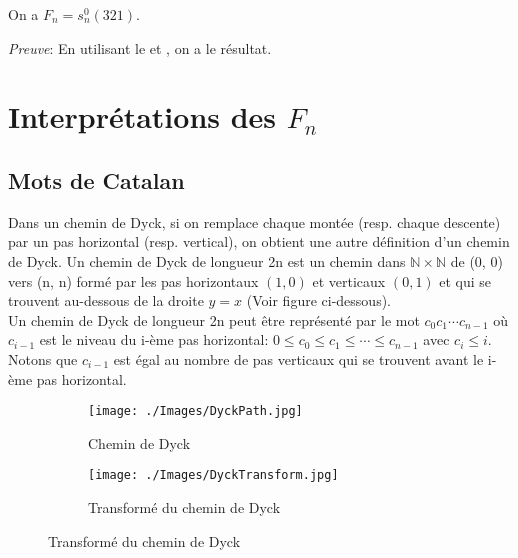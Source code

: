 \begin{corollaire} \label{fn_and_avoiding_321_without_fix}
	On a $F_{n} = s_{n}^{0}(321)$.
\end{corollaire}
\textit{Preuve}:
En utilisant le  et , on a le résultat.

\section{Interprétations des $F_{n}$}
\subsection{Mots de Catalan}
Dans un chemin de Dyck, si on remplace chaque montée (resp. chaque descente) par un pas horizontal (resp. vertical), on obtient une autre définition d’un chemin de Dyck. Un chemin de Dyck de longueur 2n est un chemin dans $\mathbb{N}\times \mathbb{N}$ de (0, 0) vers (n, n) formé par les pas horizontaux $(1, 0)$ et verticaux $(0, 1)$ et qui se trouvent au-dessous de la droite $y = x$ (Voir figure ci-dessous).\\Un chemin de Dyck de longueur 2n peut être représenté par le mot $c_{0}c_{1} \cdots c_{n-1}$ où $c_{i-1}$ est le niveau du i-ème pas horizontal: $0 \leq c_{0} \leq c_{1} \leq \cdots \leq c_{n-1}$ avec $c_{i} \leq i$. Notons que $c_{i-1}$ est égal au nombre de pas verticaux qui se trouvent avant le i-ème pas horizontal.\vspace{15pt}

\begin{figure}[h!]
	\centering
	\begin{subfigure}[b]{0.38\textwidth}
		\centering
		\texttt{[image: ./Images/DyckPath.jpg]}
		\caption{Chemin de Dyck}
	\end{subfigure}
	\hspace{2cm}
	\begin{subfigure}[b]{0.38\textwidth}
		\centering
		\texttt{[image: ./Images/DyckTransform.jpg]}
		\caption{Transformé du chemin de Dyck}
	\end{subfigure}
	\label{fig:DyckPath}
\end{figure}


